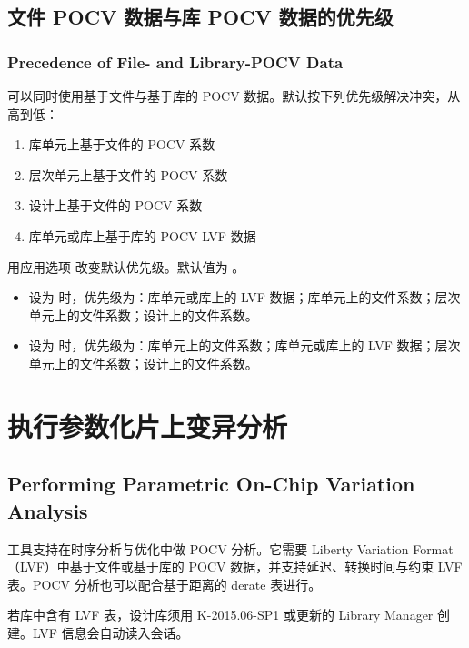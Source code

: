 \subsection{文件 POCV 数据与库 POCV 数据的优先级}
\subsubsection*{Precedence of File- and Library-POCV Data}

可以同时使用基于文件与基于库的 POCV 数据。默认按下列优先级解决冲突，从高到低：
\begin{enumerate}
  \item 库单元上基于文件的 POCV 系数
  \item 层次单元上基于文件的 POCV 系数
  \item 设计上基于文件的 POCV 系数
  \item 库单元或库上基于库的 POCV LVF 数据
\end{enumerate}

用应用选项  改变默认优先级。默认值为 。

\begin{itemize}
  \item 设为  时，优先级为：库单元或库上的 LVF 数据；库单元上的文件系数；层次单元上的文件系数；设计上的文件系数。
  \item 设为  时，优先级为：库单元上的文件系数；库单元或库上的 LVF 数据；层次单元上的文件系数；设计上的文件系数。
\end{itemize}

\section{执行参数化片上变异分析}
\subsection*{Performing Parametric On-Chip Variation Analysis}

工具支持在时序分析与优化中做 POCV 分析。它需要 Liberty Variation Format（LVF）中基于文件或基于库的 POCV 数据，并支持延迟、转换时间与约束 LVF 表。POCV 分析也可以配合基于距离的 derate 表进行。

若库中含有 LVF 表，设计库须用 K-2015.06-SP1 或更新的 Library Manager 创建。LVF 信息会自动读入会话。

